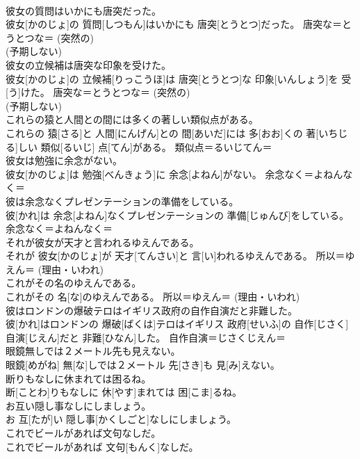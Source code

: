 \documentclass[8pt]{extreport}
\begin{document}
\begin{CJK}{UTF8}{min}
{\\	彼女の質問はいかにも唐突だった。	
\\	彼女[かのじょ]の 質問[しつもん]はいかにも 唐突[とうとつ]だった。	唐突な＝とうとつな＝ (突然の) 
\\	(予期しない) 
\\	彼女の立候補は唐突な印象を受けた。	
\\	彼女[かのじょ]の 立候補[りっこうほ]は 唐突[とうとつ]な 印象[いんしょう]を 受[う]けた。	唐突な＝とうとつな＝ (突然の) 
\\	(予期しない) 
\\	これらの猿と人間との間には多くの著しい類似点がある。	
\\	これらの 猿[さる]と 人間[にんげん]との 間[あいだ]には 多[おお]くの 著[いちじる]しい 類似[るいじ] 点[てん]がある。	類似点＝るいじてん＝ 
\\	彼女は勉強に余念がない。	
\\	彼女[かのじょ]は 勉強[べんきょう]に 余念[よねん]がない。	余念なく＝よねんなく＝ 
\\	彼は余念なくプレゼンテーションの準備をしている。	
\\	彼[かれ]は 余念[よねん]なくプレゼンテーションの 準備[じゅんび]をしている。	余念なく＝よねんなく＝ 
\\	それが彼女が天才と言われるゆえんである。	
\\	それが 彼女[かのじょ]が 天才[てんさい]と 言[い]われるゆえんである。	所以＝ゆえん＝ (理由・いわれ) 
\\	これがその名のゆえんである。	
\\	これがその 名[な]のゆえんである。	所以＝ゆえん＝ (理由・いわれ) 
\\	彼はロンドンの爆破テロはイギリス政府の自作自演だと非難した。	
\\	彼[かれ]はロンドンの 爆破[ばくは]テロはイギリス 政府[せいふ]の 自作[じさく] 自演[じえん]だと 非難[ひなん]した。	自作自演＝じさくじえん＝ 
\\	眼鏡無しでは２メートル先も見えない。	
\\	眼鏡[めがね] 無[な]しでは２メートル 先[さき]も 見[み]えない。	
\\	断りもなしに休まれては困るね。	
\\	断[ことわ]りもなしに 休[やす]まれては 困[こま]るね。	
\\	お互い隠し事なしにしましょう。	
\\	お 互[たが]い 隠し事[かくしごと]なしにしましょう。	
\\	これでビールがあれば文句なしだ。	
\\	これでビールがあれば 文句[もんく]なしだ。	
}
\end{CJK}
\end{document}
